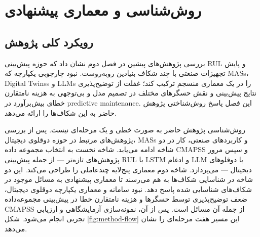\documentclass[a4paper,fleqn]{report}
\begin{document}



\chapter{روش‌شناسی و معماری پیشنهادی}\label{chap:methodology}


\section{رویکرد کلی پژوهش}\label{sec:method-approach}

بررسی پژوهش‌های پیشین در فصل دوم نشان داد که حوزه پیش‌بینی \gls{RUL} و پایش تجهیزات صنعتی با چند شکاف بنیادین روبه‌روست. نبود چارچوبی یکپارچه که \glspl{MAS}، \glspl{Digital Twins} و \glspl{LLM} را در یک معماری منسجم ترکیب کند؛ غفلت از توضیح‌پذیری نتایج پیش‌بینی و نقش حسگرهای مختلف در تصمیم مدل و بی‌توجهی به هزینه نامتقارن خطای بیش‌برآورد در \gls{predictive maintenance}. این فصل پاسخ روش‌شناختی پژوهش حاضر به این شکاف‌ها را ارائه می‌دهد.

روش‌شناسی پژوهش حاضر به صورت خطی و یک مرحله‌ای نیست. پس از بررسی پژوهش‌های مرتبط در حوزه دوقلوی دیجیتال، \glspl{MAS} و کاربردهای صنعتی، کار در دو شاخه ادامه می‌یابد. شاخه نخست به انتخاب مجموعه داده \gls{CMAPSS} و سپس مرور پژوهش‌های تازه‌تر --- از جمله پیش‌بینی \gls{RUL} با \gls{LSTM} و ادغام \gls{LLM} با دوقلوهای دیجیتال --- می‌پردازد. شاخه دوم معماری پنج‌لایه چندعاملی را طراحی می‌کند. این دو شاخه در شناسایی شکاف‌ها به هم می‌رسند تا معماری پیشنهادی به مسائل موجود در شکاف‌های شناسایی شده پاسخ دهد. نبود سامانه و معماری یکپارچه دوقلوی دیجیتال، ضعف توضیح‌پذیری توسط حسگر‌ها و هزینه نامتقارن خطا در پیش‌بینی مجموعه‌داده \gls{CMAPSS} از جمله آن مسائل است. پس از آن، نمونه‌سازی آزمایشگاهی و ارزیابی تجربی انجام می‌شود. شکل \ref{fig:method-flow} این مسیر هفت مرحله‌ای را نشان می‌دهد.
\end{document}
